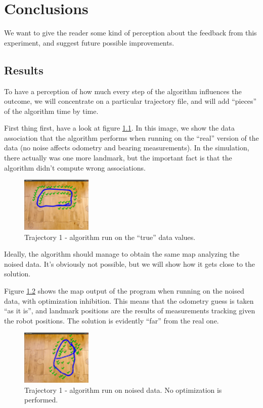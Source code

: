 \chapter{Conclusions}\label{cap:Conclusions}
We want to give the reader some kind of perception about the feedback from this experiment, and suggest future possible improvements.

\section{Results}
To have a perception of how much every step of the algorithm influences the outcome, we will concentrate on a particular trajectory file, and will add ``pieces'' of the algorithm time by time.

First thing first, have a look at figure \ref{fig:corridor_truth}.
In this image, we show the data association that the algorithm performs when running on the ``real'' version of the data (no noise affects odometry and bearing measurements).
In the simulation, there actually was one more landmark, but the important fact is that the algorithm didn't compute wrong associations.

\begin{figure}[htbp]
  \centering
    \includegraphics[width=0.3\textwidth]{images/corridor/corridor_truth.png}
  \caption{Trajectory 1 - algorithm run on the ``true'' data values.}
  \label{fig:corridor_truth}
\end{figure}

Ideally, the algorithm should manage to obtain the same map analyzing the noised data.
It's obviously not possible, but we will show how it gets close to the solution. 

Figure \ref{fig:corridor_nooptim} shows the map output of the program when running on the noised data, with optimization inhibition. This means that the odometry guess is taken ``as it is'', and landmark positions are the results of measurements tracking given the robot positions. The solution is evidently ``far'' from the real one.
\begin{figure}[htbp]
  \centering
    \includegraphics[width=0.3\textwidth]{images/corridor/corridor_nooptim.png}
  \caption{Trajectory 1 - algorithm run on noised data. No optimization is performed.}
  \label{fig:corridor_nooptim}
\end{figure}

